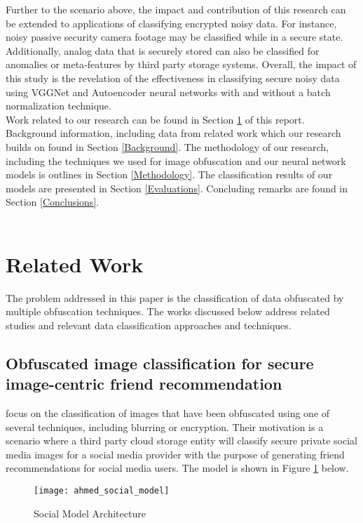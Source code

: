 \documentclass[12pt, titlepage]{article}
\begin{document}
\noindent Further to the scenario above, the impact and contribution of this research  can be extended to applications of classifying encrypted noisy data. For instance, noisy passive security camera footage may be classified while in a secure state. Additionally, analog data that is securely stored can also be classified for anomalies or meta-features by third party storage systems. Overall, the impact of this study is the revelation of the effectiveness in classifying secure noisy data using VGGNet and Autoencoder neural networks with and without a batch normalization technique.\\

\noindent Work related to our research can be found in Section \ref{RelatedWork} of this report. Background information, including data from related work which our research builds on found in Section \ref{Background}. The methodology of our research, including the techniques we used for image obfuscation and our neural network models is outlines in Section \ref{Methodology}. The classification results of our models are presented in Section \ref{Evaluations}. Concluding remarks are found in Section \ref{Conclusions}.\\

~\newpage
\section{Related Work}\label{RelatedWork}
The problem addressed in this paper is the classification of data obfuscated by multiple obfuscation techniques. The works discussed below address related studies and relevant data classification approaches and techniques.

\subsection{Obfuscated image classification for secure image-centric friend recommendation}

\noindent \cite{ahmed2018obfuscated} focus on the classification of images that have been obfuscated using one of several techniques, including blurring or encryption. Their motivation is a scenario where a third party cloud storage entity will classify secure private social media images for a social media provider with the purpose of generating friend recommendations for social media users. The model is shown in Figure \ref{Ahmed_social_model} below.
	
	\begin{figure}[h!]
		\begin{center}
			\texttt{[image: ahmed\_social\_model]}
			\caption{Social Model Architecture}
			\label{Ahmed_social_model}
		\end{center}
	\end{figure}
	
\end{document}
